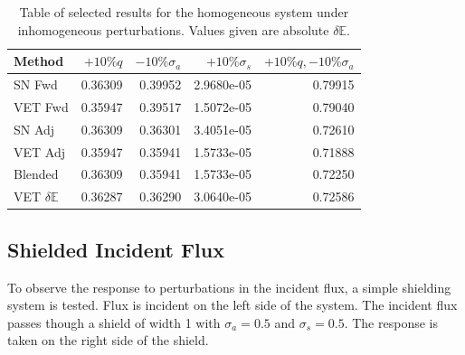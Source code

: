 \documentclass[12pt]{report}
\newcommand{\Edd}{\mathbb{E}}
\newcommand{\sigs}{\sigma_s}
\newcommand{\siga}{\sigma_a}
\begin{document}
\begin{table}[H]
\centering
  \begin{tabular}{| l | r | r | r | r |}
    \hline
    Method  &  $+10\% q $  & $-10\% \siga $ & $+10\% \sigs $ & $+10\% q,-10\% \siga$ \\ \hline
     SN Fwd 			&0.36309 &0.39952 &2.9680e-05 & 0.79915\\ \hline
     VET Fwd			&0.35947 &0.39517 &1.5072e-05 &0.79040\\ \hline
     SN Adj  			&0.36309 &0.36301 &3.4051e-05 &0.72610\\ \hline
     VET Adj 			&0.35947 &0.35941 &1.5733e-05 &0.71888\\ \hline
     Blended 			&0.36309 &0.35941 &1.5733e-05 &0.72250\\ \hline
     VET $\delta \Edd$ 	&0.36287 &0.36290 &3.0640e-05 &0.72586\\ \hline
    \end{tabular}
  \caption{Table of selected results for the homogeneous system under inhomogeneous perturbations. Values given are absolute $\delta \Edd$. }
\end{table}

\subsection{Shielded Incident Flux}
To observe the response to perturbations in the incident flux, a simple shielding system is tested. Flux is incident on the left side of the system. The incident flux passes though a shield of width 1 with $\siga=0.5$ and $\sigs=0.5$. The response is taken on the right side of the shield.
\end{document}
